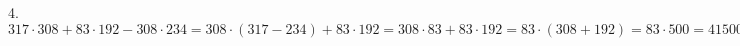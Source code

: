 4.$317\cdot308+83\cdot192-308\cdot234=308\cdot(317-234)+83\cdot192=308\cdot83+83\cdot192=83\cdot(308+192)=83\cdot500=41500.$\\
